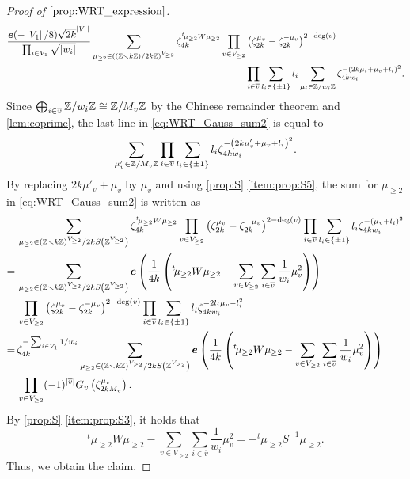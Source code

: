 \documentclass[11pt,a4paper,lualatex]{amsart}
\numberwithin{equation}{section} %
\begin{document}
\begin{proof}[Proof of $ \cref{prop:WRT_expression} $]
\begin{equation}
		\begin{aligned}
			\frac{\bm{e}(-\left\lvert V_1\right\rvert/8) \sqrt{2k}^{\left\lvert V_1\right\rvert}}{\prod_{i \in V_1} \sqrt{\left\lvert w_i\right\rvert}}
			\sum_{\mu_{\ge 2} \in \left( (\mathbb{Z} \smallsetminus k\mathbb{Z}) / 2k\mathbb{Z} \right)^{V_{ \ge 2 }}} 
			\zeta_{4k}^{{}^t\!\mu_{\ge 2} W \mu_{\ge 2}}
			\prod_{v \in V_{\ge 2}}
			&\left( \zeta_{2k}^{\mu_v} - \zeta_{2k}^{-\mu_v} \right)^{2-\deg(v)}
			\\
			&\prod_{i \in \overline{v}} \sum_{l_i \in \{ \pm 1 \} } l_i
			\sum_{\mu_i \in \mathbb{Z}/ w_i \mathbb{Z}}
			\zeta_{4k w_i}^{ -\left( 2k \mu_i + \mu_v + l_i \right)^2 }.
		\end{aligned}
	\end{equation}	
	Since $ \bigoplus_{i \in \overline{v}} \mathbb{Z}/ w_i \mathbb{Z} \cong \mathbb{Z} / M_v \mathbb{Z} $ by the Chinese remainder theorem and \cref{lem:coprime}, the last line in \cref{eq:WRT_Gauss_sum2} is equal to
	\[
	\sum_{\mu'_v \in \mathbb{Z}/ M_v \mathbb{Z}}
	\prod_{i \in \overline{v}}
	\sum_{l_i \in \{ \pm 1 \} } l_i
	\zeta_{4k w_i}^{ -\left( 2k \mu'_v + \mu_v + l_i \right)^2 }.
	\]
	By replacing $ 2k \mu'_v + \mu_v $ by $ \mu_v $ and using \cref{prop:S} \cref{item:prop:S5}, the sum for $ \mu_{\ge 2} $ in \cref{eq:WRT_Gauss_sum2} is written as
	\begin{align}
		&\sum_{\mu_{\ge 2} \in (\mathbb{Z} \smallsetminus k\mathbb{Z})^{V_{ \ge 2 }} / 2k S \left( \mathbb{Z}^{V_{ \ge 2 }} \right)} 
		\zeta_{4k}^{{}^t\!\mu_{\ge 2} W \mu_{\ge 2}} 
		\prod_{v \in V_{\ge 2}}
		\left( \zeta_{2k}^{\mu_v} - \zeta_{2k}^{-\mu_v} \right)^{2-\deg(v)} 
		\prod_{i \in \overline{v}} \sum_{l_i \in \{ \pm 1 \} } l_i
		\zeta_{4k w_i}^{ -\left( \mu_v + l_i \right)^2 } 
		\\
		= \,
		&\sum_{\mu_{\ge 2} \in (\mathbb{Z} \smallsetminus k\mathbb{Z})^{V_{ \ge 2 }} / 2k S \left( \mathbb{Z}^{V_{ \ge 2 }} \right)} 
		\bm{e} \left( 
		\frac{1}{4k} \left( 
		{}^t\!\mu_{\ge 2} W \mu_{\ge 2}
		- \sum_{v \in V_{\ge 2}} \sum_{i \in \overline{v}} \frac{1}{w_i} \mu_v^2
		\right) \right)
		\\
		&\prod_{v \in V_{\ge 2}}
		\left( \zeta_{2k}^{\mu_v} - \zeta_{2k}^{-\mu_v} \right)^{2-\deg(v)}
		\prod_{i \in \overline{v}} \sum_{l_i \in \{ \pm 1 \} } l_i
		\zeta_{4k w_i}^{ -2 l_i \mu_v - l_i^2 }
		\\
		= \,
		&\zeta_{4k}^{- \sum_{i \in V_1} 1/w_i}
		\sum_{\mu_{\ge 2} \in (\mathbb{Z} \smallsetminus k\mathbb{Z})^{V_{ \ge 2 }} / 2k S \left( \mathbb{Z}^{V_{ \ge 2 }} \right)} 
		\bm{e} \left( 
		\frac{1}{4k} \left( 
		{}^t\!\mu_{\ge 2} W \mu_{\ge 2}
		- \sum_{v \in V_{\ge 2}} \sum_{i \in \overline{v}} \frac{1}{w_i} \mu_v^2
		\right) \right) \\
		&\prod_{v \in V_{\ge 2}} (-1)^{\left\lvert\overline{v}\right\rvert} G_v \left( \zeta_{2kM_v}^{\mu_v} \right).
	\end{align}
	By \cref{prop:S} \cref{item:prop:S3}, it holds that
	\[
	{}^t\!\mu_{\ge 2} W \mu_{\ge 2}
	- \sum_{v \in V_{\ge 2}} \sum_{ i \in \overline{v} } \frac{1}{w_i} \mu_v^2
	=
	-{}^t\!\mu_{\ge 2} S^{-1} \mu_{\ge 2}.
	\]
	Thus, we obtain the claim.
\end{proof}
\end{document}
